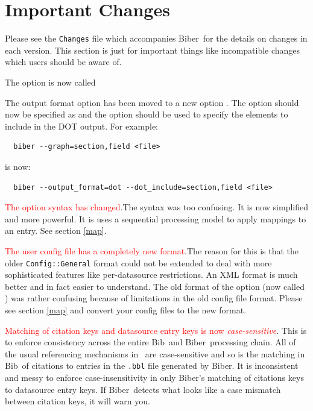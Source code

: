 \documentclass{ltxdockit}
\newcommand*{\biber}{Biber\xspace}
\begin{document}
\printtitlepage
\tableofcontents

\section{Important Changes}\label{special}

Please see the \verb+Changes+ file which accompanies \biber\ for the
details on changes in each version. This section is just for important
things like incompatible changes which users should be aware of.

The  option is now called 

The output format option  has been moved to a
new option . The option  should now be
specified as  and the \linebreak{} option
should be used to specify the elements to include in the DOT output. For
example:

\begin{verbatim}
  biber --graph=section,field <file>
\end{verbatim}

\noindent is now:

\begin{verbatim}
  biber --output_format=dot --dot_include=section,field <file>
\end{verbatim}

\textcolor{red}{The  option syntax has changed}.The syntax
was too confusing. It is now simplified and more powerful. It is uses a
sequential processing model to apply mappings to an entry. See section
\ref{map}.

\textcolor{red}{The user config file has a completely new format}.The
  reason for this is that the older \verb+Config::General+ format
  could not be extended to deal with more sophisticated features like
  per-datasource restrictions. An XML format is much better and in
  fact easier to understand. The old format of the  option
  (now called ) was rather confusing because
  of limitations in the old config file format. Please see section
  \ref{map} and convert your config files to the new format.

\textcolor{red}{Matching of citation keys and datasource entry keys is now
  \emph{case-sensitive}}. This is to enforce consistency across the entire
Bib\latex\ and \biber\ processing chain. All of the usual referencing
mechanisms in \latex\ are case-sensitive and so is the matching in
Bib\latex\ of citations to entries in the \texttt{.bbl} file generated by
\biber. It is inconsistent and messy to enforce case-insensitivity in only
\biber's matching of citations keys to datasource entry keys. If \biber\
detects what looks like a case mismatch between citation keys, it will warn
you.
\end{document}

